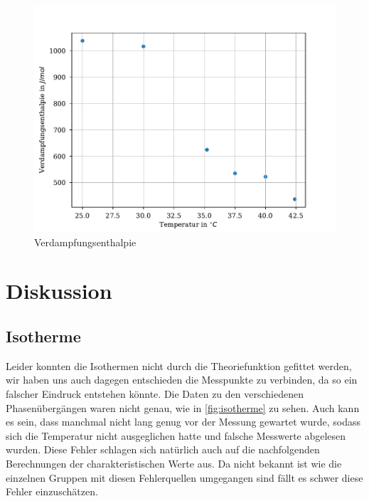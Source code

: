 \documentclass[11pt, a4paper]{article}
\begin{document}
    \begin{figure}
        \centering
        \includegraphics[width=\textwidth]{./Plots/verd.pdf}

        \caption{Verdampfungsenthalpie}
        \label{fig:verd}
    \end{figure}
    \section{Diskussion}
    \subsection{Isotherme}
    Leider konnten die Isothermen nicht durch die Theoriefunktion gefittet werden, wir haben uns auch dagegen entschieden die 
    Messpunkte zu verbinden, da so ein falscher Eindruck entstehen könnte. Die Daten zu den verschiedenen Phasenübergängen waren 
    nicht genau, wie in \ref{fig:isotherme} zu sehen. Auch kann es sein, dass manchmal nicht lang genug vor der 
    Messung gewartet wurde, sodass sich die Temperatur nicht ausgeglichen hatte und falsche Messwerte abgelesen wurden.
    Diese Fehler schlagen sich natürlich auch auf die nachfolgenden Berechnungen der charakteristischen Werte aus. 
    Da nicht bekannt ist wie die einzelnen Gruppen mit diesen Fehlerquellen umgegangen sind fällt es schwer diese Fehler einzuschätzen.
\end{document}
